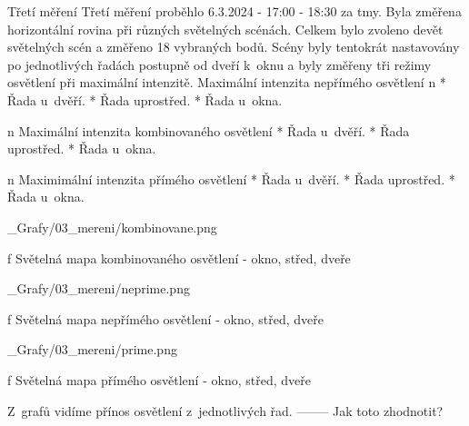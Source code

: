 \sec Třetí měření
Třetí měření proběhlo 6.3.2024 - 17:00 - 18:30 za tmy. Byla změřena horizontální rovina při různých světelných scénách.
Celkem bylo zvoleno devět světelných scén a změřeno 18 vybraných bodů. Scény byly tentokrát nastavovány po jednotlivých
řadách postupně od dveří k~oknu a byly změřeny tři režimy osvětlení při maximální intenzitě.
\medskip
{\sbf Maximální intenzita nepřímého osvětlení}
\medskip
\begitems \style n
    * Řada u~dvěří.
    * Řada uprostřed.
    * Řada u~okna.
\enditems

\medskip
\begitems \style n
{\sbf Maximální intenzita kombinovaného osvětlení}
\medskip
    * Řada u~dvěří.
    * Řada uprostřed.
    * Řada u~okna.
\enditems
\medskip

\begitems \style n
{\sbf Maximimální intenzita přímého osvětlení}
\medskip
    * Řada u~dvěří.
    * Řada uprostřed.
    * Řada u~okna.
\enditems

\medskip {}
\picw=18cm _Grafy/03_mereni/kombinovane.png
\caption/f Světelná mapa kombinovaného osvětlení - okno, střed, dveře
\medskip

\medskip {}
\picw=18cm _Grafy/03_mereni/neprime.png
\caption/f Světelná mapa nepřímého osvětlení - okno, střed, dveře
\medskip

\medskip {}
\picw=18cm _Grafy/03_mereni/prime.png
\caption/f Světelná mapa přímého osvětlení - okno, střed, dveře
\medskip

Z~grafů vidíme přínos osvětlení z~jednotlivých řad. -------- Jak toto zhodnotit?